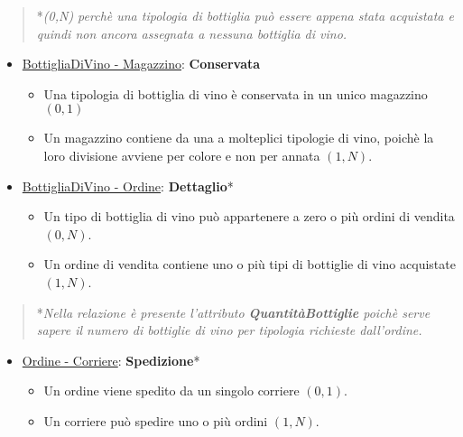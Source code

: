 \begin{verse}
	*\emph{(0,N) perchè una tipologia di bottiglia può essere appena stata acquistata e quindi non ancora assegnata a nessuna bottiglia di vino.}
\end{verse}

\begin{itemize}
	\item \underline{BottigliaDiVino - Magazzino}: \textbf{Conservata}
	
	\begin{itemize}
		\item Una tipologia di bottiglia di vino è conservata in un unico magazzino $(0,1)$
		\item Un magazzino contiene da una a molteplici tipologie di vino, poichè la loro divisione avviene per colore e non per annata $(1,N)$.
	\end{itemize}
	
\end{itemize}

\begin{itemize}
	\item \underline{BottigliaDiVino - Ordine}: \textbf{Dettaglio}*
	
	\begin{itemize}
		\item Un tipo di bottiglia di vino può appartenere a zero o più ordini di vendita $(0,N)$.
		\item Un ordine di vendita contiene uno o più tipi di bottiglie di vino acquistate $(1,N)$.
	\end{itemize}
	
\end{itemize}

\begin{verse}
	*\emph{Nella relazione è presente l'attributo \textbf{QuantitàBottiglie} poichè serve sapere il numero di bottiglie di vino per tipologia richieste dall'ordine.}
\end{verse}

\begin{itemize}
	\item \underline{Ordine - Corriere}: \textbf{Spedizione}*
	
	\begin{itemize}
		\item Un ordine viene spedito da un singolo corriere $(0,1)$.
		\item Un corriere può spedire uno o più ordini $(1,N)$.
	\end{itemize}
	
\end{itemize}


